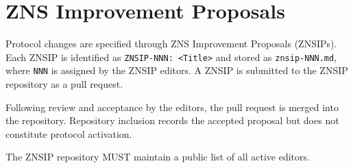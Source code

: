\section{ZNS Improvement Proposals}
\label{sec:znsips}

Protocol changes are specified through ZNS Improvement Proposals (ZNSIPs). Each ZNSIP is identified as \texttt{ZNSIP-NNN: <Title>} and stored as \texttt{znsip-NNN.md}, where \texttt{NNN} is assigned by the ZNSIP editors. A ZNSIP is submitted to the ZNSIP repository as a pull request.

Following review and acceptance by the editors, the pull request is merged into the repository. Repository inclusion records the accepted proposal but does not constitute protocol activation.

The ZNSIP repository MUST maintain a public list of all active editors.
